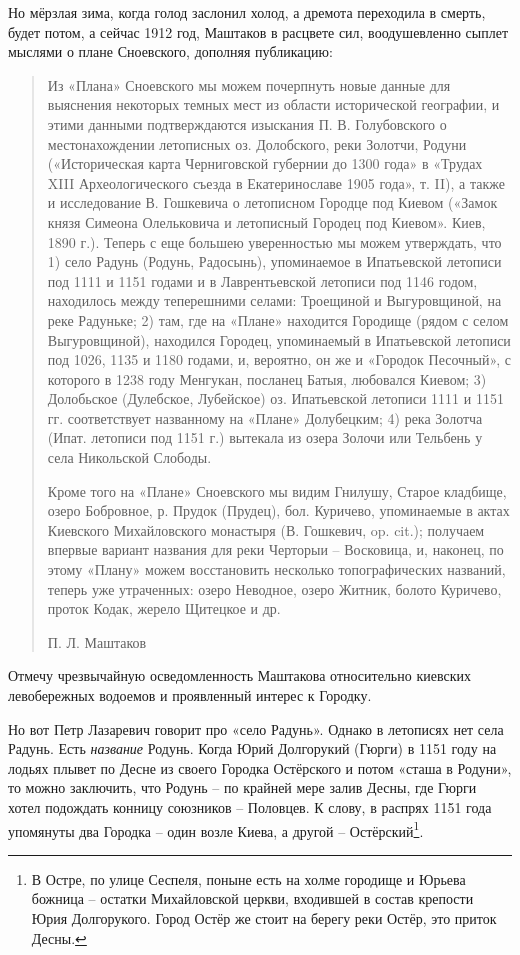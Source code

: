 Но мёрзлая зима, когда голод заслонил холод, а дремота переходила в смерть, будет потом, а сейчас 1912 год, Маштаков в расцвете сил, воодушевленно сыплет мыслями о плане Сноевского, дополняя публикацию:

\begin{quotation}
Из «Плана» Сноевского мы можем почерпнуть новые данные для выяснения некоторых темных мест из области исторической географии, и этими данными подтверждаются изыскания П. В. Голубовского о местонахождении летописных оз. Долобского, реки Золотчи, Родуни («Историческая карта Черниговской губернии до 1300 года» в «Трудах XIII Археологического съезда в Екатеринославе 1905 года», т. II), а также и исследование В. Гошкевича о летописном Городце под Киевом («Замок князя Симеона Олельковича и летописный Городец под Киевом». Киев, 1890 г.). Теперь с еще большею уверенностью мы можем утверждать, что 1) село Радунь (Родунь, Радосынь), упоминаемое в Ипатьевской летописи под 1111 и 1151 годами и в Лаврентьевской летописи под 1146 годом, находилось между теперешними селами: Троещиной и Выгуровщиной, на реке Радуньке; 2) там, где на «Плане» находится Городище (рядом с селом Выгуровщиной), находился Городец, упоминаемый в Ипатьевской летописи под 1026, 1135 и 1180 годами, и, вероятно, он же и «Городок Песочный», с которого в 1238 году Менгукан, посланец Батыя, любовался Киевом; 3) Долобьское (Дулебское, Лубейское) оз. Ипатьевской летописи 1111 и 1151 гг. соответствует названному на «Плане» Долубецким; 4) река Золотча (Ипат. летописи под 1151 г.) вытекала из озера Золочи или Тельбень у села Никольской Слободы.

Кроме того на «Плане» Сноевского мы видим Гнилушу, Старое кладбище, озеро Бобровное, р. Прудок (Прудец), бол. Куричево, упоминаемые в актах Киевского Михайловского монастыря (В. Гошкевич, op. cit.); получаем впервые вариант названия для реки Черторыи – Восковица, и, наконец, по этому «Плану» можем восстановить несколько топографических названий, теперь уже утраченных: озеро Неводное, озеро Житник, болото Куричево, проток Кодак, жерело Щитецкое и др.

П. Л. Маштаков
\end{quotation}

Отмечу чрезвычайную осведомленность Маштакова относительно киевских левобережных водоемов и проявленный интерес к Городку.

Но вот Петр Лазаревич говорит про «село Радунь». Однако в летописях нет села Радунь. Есть \textit{название} Родунь. Когда Юрий Долгорукий (Гюрги) в 1151 году на лодьях плывет по Десне из своего Городка Остёрского и потом «сташа в Родуни», то можно заключить, что Родунь – по крайней мере залив Десны, где Гюрги хотел подождать конницу союзников – Половцев. К слову, в распрях 1151 года упомянуты два Городка – один возле Киева, а другой – Остёрский\footnote{В Остре, по улице Сеспеля, поныне есть на холме городище и Юрьева божница – остатки Михайловской церкви, входившей в состав крепости Юрия Долгорукого. Город Остёр же стоит на берегу реки Остёр, это приток Десны.}.

